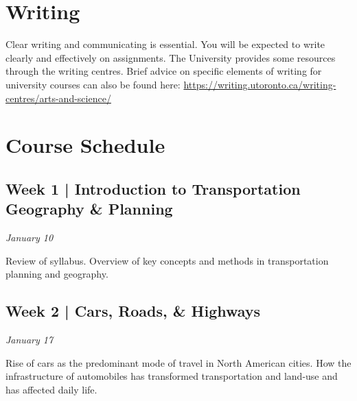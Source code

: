 \documentclass[11pt]{article}
\begin{document}
	
	\section*{Writing}
	
	Clear writing and communicating is essential. You will be expected to write clearly and effectively on
	assignments. The University provides some resources through the writing centres. Brief advice on
	specific elements of writing for university courses can also be found here:	
	\url{https://writing.utoronto.ca/writing-centres/arts-and-science/}
	


	\newpage
	
	\section*{Course Schedule}
	
	
	\subsection*{Week 1 | Introduction to Transportation Geography \& Planning}
	
	\textit{January 10}

	Review of syllabus. Overview of key concepts and methods in transportation planning and geography. 
	
	
	
	
	
		
	
	\subsection*{Week 2 | Cars, Roads, \& Highways}
	
	\textit{January 17}
	
	Rise of cars as the predominant mode of travel in North American cities. How the infrastructure of automobiles has transformed transportation and land-use and has affected daily life. 
	
\end{document}
